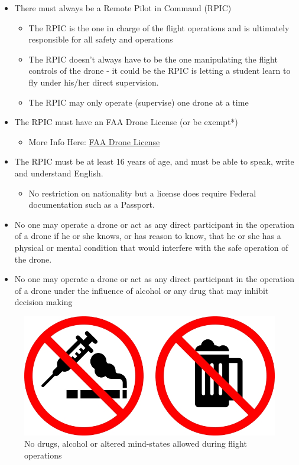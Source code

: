 \documentclass[
  12pt,
]{book}
\providecommand{\tightlist}{%
  \setlength{\itemsep}{0pt}\setlength{\parskip}{0pt}}
\begin{document}
\begin{itemize}
\tightlist
\item
  There must always be a Remote Pilot in Command (RPIC)

  \begin{itemize}
  \tightlist
  \item
    The RPIC is the one in charge of the flight operations and is ultimately responsible for all safety and operations
  \item
    The RPIC doesn't always have to be the one manipulating the flight controls of the drone - it could be the RPIC is letting a student learn to fly under his/her direct supervision.
  \item
    The RPIC may only operate (supervise) one drone at a time
  \end{itemize}
\item
  The RPIC must have an FAA Drone License (or be exempt*)

  \begin{itemize}
  \tightlist
  \item
    More Info Here: \hyperref[license]{FAA Drone License}
  \end{itemize}
\item
  The RPIC must be at least 16 years of age, and must be able to speak, write and understand English.

  \begin{itemize}
  \tightlist
  \item
    No restriction on nationality but a license does require Federal documentation such as a Passport.
  \end{itemize}
\item
  No one may operate a drone or act as any direct participant in the operation of a drone if he or she knows, or has reason to know, that he or she has a physical or mental condition that would interfere with the safe operation of the drone.
\item
  No one may operate a drone or act as any direct participant in the operation of a drone under the influence of alcohol or any drug that may inhibit decision making
\end{itemize}

\begin{figure}

{\centering \includegraphics[width=0.7\linewidth]{images/no_drugs} 

}

\caption{No drugs, alcohol or altered mind-states allowed during flight operations}\label{fig:drugs}
\end{figure}
\end{document}
